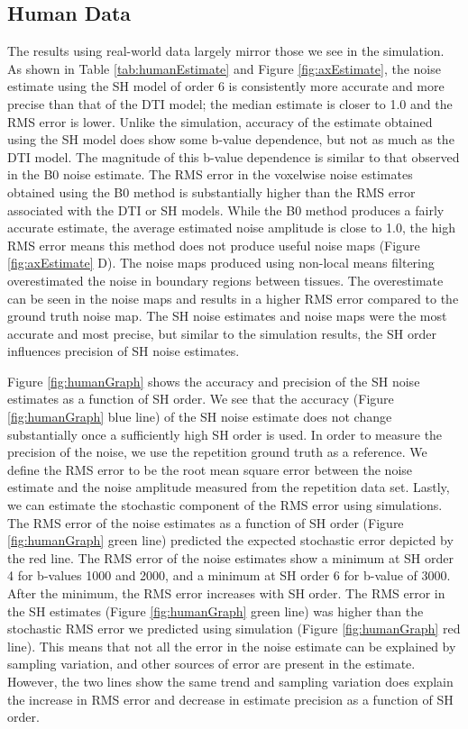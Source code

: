 \subsection{Human Data}

The results using real-world data largely mirror those we see in the
simulation. As shown in Table \ref{tab:humanEstimate} and Figure \ref{fig:axEstimate}, the noise estimate using
the SH model of order 6 is consistently more accurate and more precise
than that of the DTI model; the median estimate is closer to 1.0 and the
RMS error is lower. Unlike the simulation, accuracy of the estimate
obtained using the SH model does show some b-value dependence, but not
as much as the DTI model. The magnitude of this b-value dependence is
similar to that observed in the B0 noise estimate. The RMS error in the
voxelwise noise estimates obtained using the B0 method is substantially
higher than the RMS error associated with the DTI or SH models. While
the B0 method produces a fairly accurate estimate, the average estimated
noise amplitude is close to 1.0, the high RMS error means this method
does not produce useful noise maps (Figure \ref{fig:axEstimate} D). The noise maps produced
using non-local means filtering overestimated the noise in boundary
regions between tissues. The overestimate can be seen in the noise maps
and results in a higher RMS error compared to the ground truth noise
map. The SH noise estimates and noise maps were the most accurate and
most precise, but similar to the simulation results, the SH order
influences precision of SH noise estimates.

Figure \ref{fig:humanGraph} shows the accuracy and precision of the SH noise estimates as a
function of SH order. We see that the accuracy (Figure \ref{fig:humanGraph} blue line) of
the SH noise estimate does not change substantially once a sufficiently
high SH order is used. In order to measure the precision of the noise,
we use the repetition ground truth as a reference. We define the RMS
error to be the root mean square error between the noise estimate and
the noise amplitude measured from the repetition data set. Lastly, we
can estimate the stochastic component of the RMS error using
simulations. The RMS error of the noise estimates as a function of SH
order (Figure \ref{fig:humanGraph} green line) predicted the expected stochastic error
depicted by the red line. The RMS error of the noise estimates show a
minimum at SH order 4 for b-values 1000 and 2000, and a minimum at SH
order 6 for b-value of 3000. After the minimum, the RMS error increases
with SH order. The RMS error in the SH estimates (Figure \ref{fig:humanGraph} green line)
was higher than the stochastic RMS error we predicted using simulation
(Figure \ref{fig:humanGraph} red line). This means that not all the error in the noise
estimate can be explained by sampling variation, and other sources of
error are present in the estimate. However, the two lines show the same
trend and sampling variation does explain the increase in RMS error and
decrease in estimate precision as a function of SH order.

